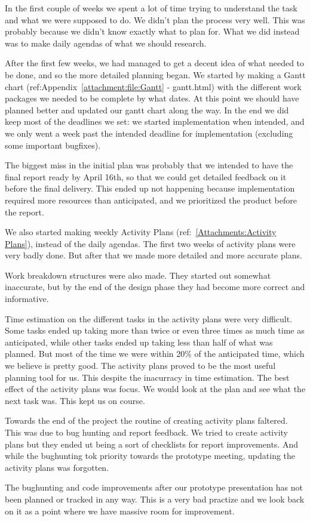 In the first couple of weeks we spent a lot of time trying to understand the task and what we were supposed to do. We didn't plan the process very well. This was probably because we didn't know exactly what to plan for. What we did instead was to make daily agendas of what we should research.

After the first few weeks, we had managed to get a decent idea of what needed to be done, and so the more detailed planning began. We started by making a Gantt chart (ref:Appendix~\ref{attachment:file:Gantt} - gantt.html) with the different work packages we needed to be complete by what dates. At this point we should have planned better and updated our gantt chart along the way. In the end we did keep most of the deadlines we set: we started implementation when intended, and we only went a week past the intended deadline for implementation (excluding some important bugfixes). 

The biggest miss in the initial plan was probably that we intended to have the final report ready by April 16th, so that we could get detailed feedback on it before the final delivery. This ended up not happening because implementation required more resources than anticipated, and we prioritized the product before the report.

We also started making weekly Activity Plans (ref:~\ref{Attachments:Activity Plans}), instead of the daily agendas. The first two weeks of activity plans were very badly done. But after that we made more detailed and more accurate plans.

Work breakdown structures were also made. They started out somewhat inaccurate, but by the end of the design phase they had become more correct and informative. 

Time estimation on the different tasks in the activity plans were very difficult. Some tasks ended up taking more than twice or even three times as much time as anticipated, while other tasks ended up taking less than half of what was planned. But most of the time we were within 20\% of the anticipated time, which we believe is pretty good. The activity plans proved to be the most useful planning tool for us. This despite the inacurracy in time estimation. The best effect of the activity plans was focus. We would look at the plan and see what the next task was. This kept us on course. 

Towards the end of the project the routine of creating activity plans faltered. This was due to bug hunting and report feedback. We tried to create activity plans but they ended ut being a sort of checklists for report improvements. And while the bughunting tok priority towards the prototype meeting, updating the activity plans was forgotten.
    
The bughunting and code improvements after our prototype presentation has not been planned or tracked in any way. This is a very bad practize and we look back on it as a point where we have massive room for improvement.

